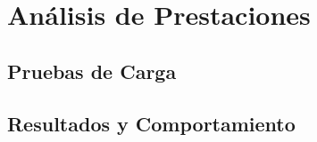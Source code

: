\chapter{Análisis de Prestaciones}

\section{Pruebas de Carga}

\section{Resultados y Comportamiento}


